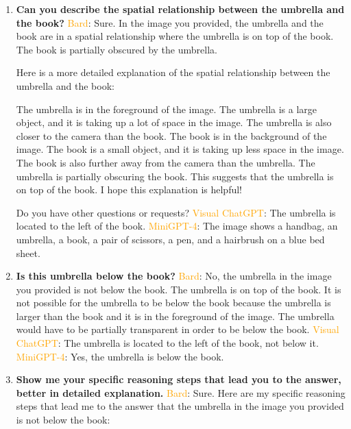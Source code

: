 \begin{enumerate}
    \item \textbf{Can you describe the spatial relationship between the umbrella and the book?}
    \subitem \textcolor{orange}{Bard}: 
    Sure. In the image you provided, the umbrella and the book are in a spatial relationship where the umbrella is on top of the book. The book is partially obscured by the umbrella.
    
    Here is a more detailed explanation of the spatial relationship between the umbrella and the book:
    
    The umbrella is in the foreground of the image. The umbrella is a large object, and it is taking up a lot of space in the image. The umbrella is also closer to the camera than the book.
    The book is in the background of the image. The book is a small object, and it is taking up less space in the image. The book is also further away from the camera than the umbrella.
    The umbrella is partially obscuring the book. This suggests that the umbrella is on top of the book.
    I hope this explanation is helpful!
    
    Do you have other questions or requests?
    \subitem \textcolor{orange}{Visual ChatGPT}: The umbrella is located to the left of the book.
    \subitem \textcolor{orange}{MiniGPT-4}: The image shows a handbag, an umbrella, a book, a pair of scissors, a pen, and a hairbrush on a blue bed sheet.
    \item \textbf{Is this umbrella below the book?}
    \subitem \textcolor{orange}{Bard}: 
    No, the umbrella in the image you provided is not below the book. The umbrella is on top of the book. It is not possible for the umbrella to be below the book because the umbrella is larger than the book and it is in the foreground of the image. The umbrella would have to be partially transparent in order to be below the book.
    \subitem \textcolor{orange}{Visual ChatGPT}: The umbrella is located to the left of the book, not below it.
    \subitem \textcolor{orange}{MiniGPT-4}: Yes, the umbrella is below the book.
    \item \textbf{Show me your specific reasoning steps that lead you to the answer, better in detailed explanation.}
    \subitem \textcolor{orange}{Bard}: 
    Sure. Here are my specific reasoning steps that lead me to the answer that the umbrella in the image you provided is not below the book:
    

\end{enumerate}
